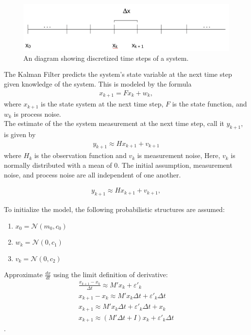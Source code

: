 \begin{figure}[h]
    \centering
    \includegraphics[scale = 0.3]{kgraph.png}
    \caption{An diagram showing discretized time steps of a system.}
    \label{coffee}
\end{figure}

\noindent The Kalman Filter predicts the system's state variable at the next time step given knowledge of the system. This is modeled by the formula
\begin{align*}
       x_{k+1} = F x_k + w_k,
    \end{align*}
    where $x_{k+1}$ is the state system at the next time step, $F$ is the state function, and $w_k$ is process noise.  \\

The estimate of the the system measurement at the next time step, call it $y_{k+1}$, is given by 
\begin{align*}
	y_{k+1} \approx H x_{k+1} + v_{k+1}
\end{align*}
where $H_k$ is the observation function and $v_k$ is measurement noise, Here, $v_k$ is normally distributed with a mean of 0. The initial assumption, measurement noise, and process noise are all independent of one another.

\begin{align*}
	y_{k+1} \approx H x_{k+1} + v_{k+1},
\end{align*}

\noindent To initialize the model, the following probabilistic structures are assumed:
\begin{enumerate}
\item $x_0 = \mathcal{N}(m_0, c_0) $
\item $w_k = \mathcal{N}(0, c_1)$
\item $v_k = \mathcal{N}(0, c_2)$

\end{enumerate} 


Approximate $\frac{dx}{dt}$ using the limit definition of derivative:
\begin{align*}
	\frac{x_{k+1} - x_k}{\Delta t} \approx M'x_k + \varepsilon '_k \\
	x_{k+1} - x_k \approx M'x_k \Delta t + \varepsilon '_k  \Delta t \\
	x_{k+1} \approx M'x_k \Delta t + \varepsilon '_k  \Delta t + x_k \\
	x_{k+1} \approx (M' \Delta t + I)x_k + \varepsilon '_k  \Delta t
\end{align*}.

